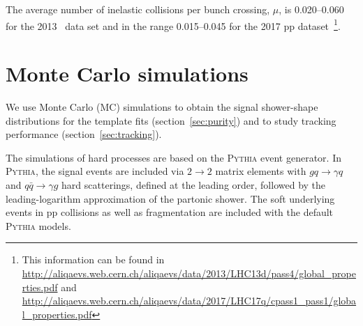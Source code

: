 The average number of inelastic collisions per bunch crossing, $\mu$, is 0.020--0.060 for the 2013 \pPb~data set and in the range 0.015--0.045 for the 2017 pp dataset~\footnote{This information can be found in \url{http://aliqaevs.web.cern.ch/aliqaevs/data/2013/LHC13d/pass4/global_properties.pdf} and \url{http://aliqaevs.web.cern.ch/aliqaevs/data/2017/LHC17q/cpass1_pass1/global_properties.pdf}}.%







\section{Monte Carlo simulations}
\label{sec:mcsimulations}
We use Monte Carlo (MC) simulations to obtain the signal shower-shape distributions for the template fits (section~\ref{sec:purity}) and to study tracking performance (section~\ref{sec:tracking}).

The simulations of hard processes are based on the \textsc{Pythia} event generator. In \textsc{Pythia}, the signal events are included via $2\to2$ matrix elements with $gq\to\gamma q$ and $q\bar{q}\to\gamma g$ hard scatterings, defined at the leading order, followed by the leading-logarithm approximation of the partonic shower. The soft underlying events in pp collisions as well as fragmentation are included with the default \textsc{Pythia} models. 

